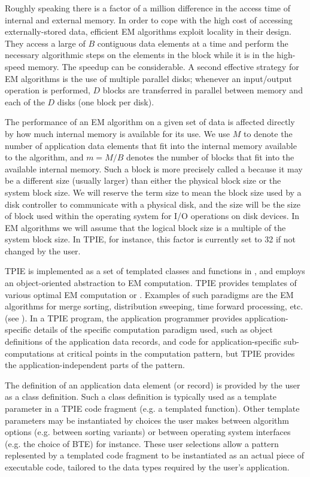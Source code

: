 Roughly speaking there is a factor of a million difference in the
access time of internal and external memory.  In order to cope with
the high cost of accessing externally-stored data, efficient EM
algorithms exploit locality in their design.  They access a large
 of $B$ contiguous data elements at a time and perform
the necessary algorithmic steps on the elements in the block while it
is in the high-speed memory. The speedup can be considerable.  A
second effective strategy for EM algorithms is the use of multiple
parallel disks; whenever an input/output operation is performed, $D$
blocks are transferred in parallel between memory and each of the $D$
disks (one block per disk).

The performance of an EM algorithm on a given set of data is affected
directly by how much internal memory is available for its use. We use
$M$ to denote the number of application data elements that fit into
the internal memory available to the algorithm, and $m=M/B$ denotes
the number of blocks that fit into the available internal memory. Such
a block is more precisely called a  because it
may be a different size (usually larger) than either the physical
block size or the system block size. We will reserve the term
 size to mean the block size used by a disk
controller to communicate with a physical disk, and the  size will be the size of block used within the operating
system for I/O operations on disk devices. In EM algorithms we will
assume that the logical block size is a multiple of the system block
size. In TPIE, for instance, this factor is currently set to 32 if not
changed by the user.

TPIE is implemented as a set of templated classes and functions in
\CPP{}, and employs an object-oriented abstraction to EM computation.
TPIE provides \CPP{} templates of various optimal EM computation
 or .  Examples of such paradigms are
the EM algorithms for merge sorting, distribution sweeping, time
forward processing, etc. (see \cite{vitter:dimacssurvey}). In a TPIE
program, the application programmer provides application-specific
details of the specific computation paradigm used, such as \CPP{}
object definitions of the application data records, and code for
application-specific sub-computations at critical points in the
computation pattern, but TPIE provides the application-independent
parts of the pattern.

The definition of an application data element (or record) is provided
by the user as a class definition.  Such a class definition is
typically used as a template parameter in a TPIE code fragment (e.g. a
templated function). Other template parameters may be instantiated by
choices the user makes between algorithm options (e.g. between sorting
variants) or between operating system interfaces (e.g. the choice of
BTE) for instance. These
user selections allow a pattern replesented by a templated \CPP{} code
fragment to be instantiated as an actual piece of executable code,
tailored to the data types required by the user's application.

